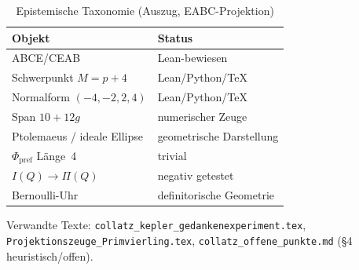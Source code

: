 \documentclass[11pt,a4paper]{article}
\theoremstyle{definition}
\theoremstyle{remark}
\begin{document}
\begin{table}[h]
  \centering
  \caption{Epistemische Taxonomie (Auszug, EABC-Projektion)}
  \begin{tabular}{@{}ll@{}}
    \toprule
    Objekt & Status \\
    \midrule
    ABCE/CEAB & Lean-bewiesen \\
    Schwerpunkt $M=p+4$ & Lean/Python/TeX \\
    Normalform $(-4,-2,2,4)$ & Lean/Python/TeX \\
    Span $10+12g$ & numerischer Zeuge \\
    Ptolemaeus / ideale Ellipse & geometrische Darstellung \\
    $\Phi_{\mathrm{pref}}$ Länge~4 & trivial \\
    $I(Q)\to\Pi(Q)$ & negativ getestet \\
    Bernoulli-Uhr & definitorische Geometrie \\
    \bottomrule
  \end{tabular}
\end{table}

\medskip
\noindent
Verwandte Texte:
\texttt{collatz\_kepler\_gedankenexperiment.tex},
\texttt{Projektionszeuge\_Primvierling.tex},
\texttt{collatz\_offene\_punkte.md} (§4 heuristisch/offen).
\end{document}
